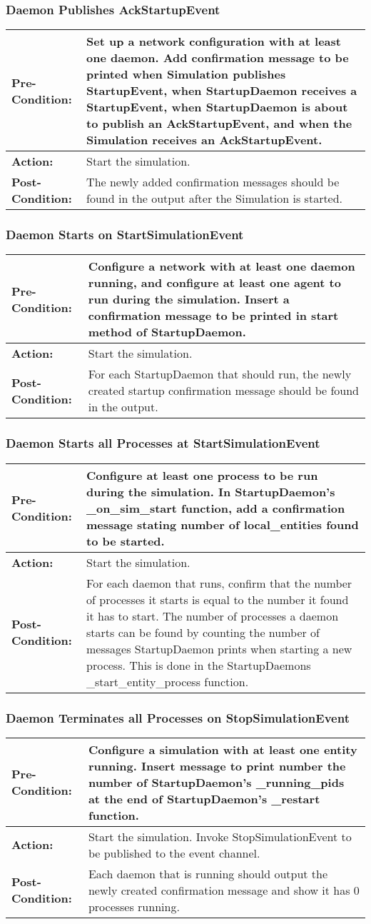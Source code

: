 \documentclass[titlepage]{article}
\newcommand{\testcase}[3]{
    \begin{center}
    \begin{tabular}{| l | p{0.7\textwidth}|}
        \hline
        \rowcolor[gray]{0.8}\textbf{Pre-Condition:} & #1 \\ \hline
        \textbf{Action:} & #2 \\ \hline
        \rowcolor[gray]{0.8}\textbf{Post-Condition:} & #3 \\ \hline
    \end{tabular}
    \end{center}
}
\begin{document}
\subsubsection{Daemon Publishes AckStartupEvent}
\testcase{Set up a network configuration with at least one daemon.  Add confirmation message to be printed when Simulation publishes StartupEvent, when StartupDaemon receives a StartupEvent, when StartupDaemon is about to publish an AckStartupEvent, and when the Simulation receives an AckStartupEvent.}{Start the simulation.}{The newly added confirmation messages should be found in the output after the Simulation is started.}

\subsubsection{Daemon Starts on StartSimulationEvent}
\testcase{Configure a network with at least one daemon running, and configure at least one agent to run during the simulation.  Insert a confirmation message to be printed in start method of StartupDaemon.}{Start the simulation.}{For each StartupDaemon that should run, the newly created startup confirmation message should be found in the output.}

\subsubsection{Daemon Starts all Processes at StartSimulationEvent}
\testcase{Configure at least one process to be run during the simulation.  In StartupDaemon's \_on\_sim\_start function,
add a confirmation message stating number of local\_entities found to be started.}{Start the simulation.}{For each
daemon that runs, confirm that the number of processes it starts is equal to the number it found it has to start.  The
number of processes a daemon starts can be found by counting the number of messages StartupDaemon prints when starting a
new process.  This is done in the StartupDaemons \_start\_entity\_process function.}

\subsubsection{Daemon Terminates all Processes on StopSimulationEvent}
\testcase{Configure a simulation with at least one entity running.  Insert message to print number the number of
StartupDaemon's \_running\_pids at the end of StartupDaemon's \_restart function.}{Start the simulation. Invoke StopSimulationEvent to be published to the event channel.}{Each daemon that is running should output the newly created confirmation message and show it has 0 processes running.}
\end{document}
